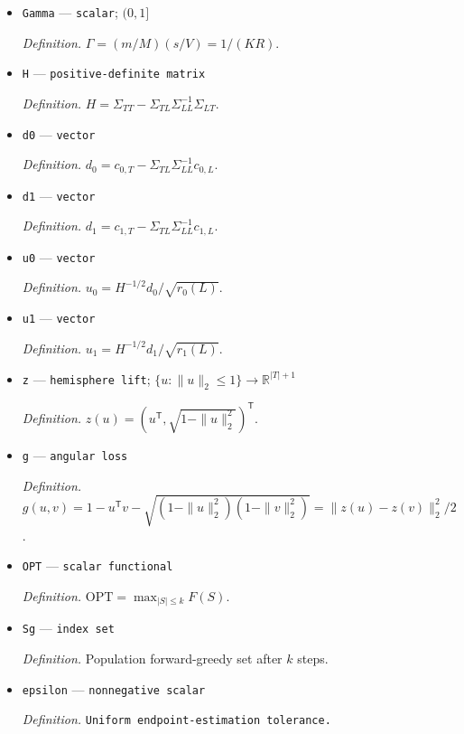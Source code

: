 \documentclass{article}
\begin{document}
\begin{itemize}
  \par\smallskip\noindent\emph{Definition.} Budget-\(k\) submodularity ratio of \(F\), with zero denominators omitted and value one if all denominators vanish.
  \item \texttt{Gamma} --- \texttt{scalar}; \((0,1]\)
  \par\smallskip\noindent\emph{Definition.} \(\Gamma=(m/M)(s/V)=1/(KR)\).
  \item \texttt{H} --- \texttt{positive-\allowbreak{}definite matrix}
  \par\smallskip\noindent\emph{Definition.} \(H=\Sigma_{TT}-\Sigma_{TL}\Sigma_{LL}^{-1}\Sigma_{LT}\).
  \item \texttt{d0} --- \texttt{vector}
  \par\smallskip\noindent\emph{Definition.} \(d_0=c_{0,T}-\Sigma_{TL}\Sigma_{LL}^{-1}c_{0,L}\).
  \item \texttt{d1} --- \texttt{vector}
  \par\smallskip\noindent\emph{Definition.} \(d_1=c_{1,T}-\Sigma_{TL}\Sigma_{LL}^{-1}c_{1,L}\).
  \item \texttt{u0} --- \texttt{vector}
  \par\smallskip\noindent\emph{Definition.} \(u_0=H^{-1/2}d_0/\sqrt{r_0(L)}\).
  \item \texttt{u1} --- \texttt{vector}
  \par\smallskip\noindent\emph{Definition.} \(u_1=H^{-1/2}d_1/\sqrt{r_1(L)}\).
  \item \texttt{z} --- \texttt{hemisphere lift}; \(\{u:\|u\|_2\le1\}\to\mathbb R^{|T|+1}\)
  \par\smallskip\noindent\emph{Definition.} \(z(u)=(u^{\mathsf T},\sqrt{1-\|u\|_2^2})^{\mathsf T}\).
  \item \texttt{g} --- \texttt{angular loss}
  \par\smallskip\noindent\emph{Definition.} \(g(u,v)=1-u^{\mathsf T}v-\sqrt{(1-\|u\|_2^2)(1-\|v\|_2^2)}=\|z(u)-z(v)\|_2^2/2\).
  \item \texttt{OPT} --- \texttt{scalar functional}
  \par\smallskip\noindent\emph{Definition.} \(\mathrm{OPT}=\max_{|S|\le k}F(S)\).
  \item \texttt{Sg} --- \texttt{index set}
  \par\smallskip\noindent\emph{Definition.} Population forward-greedy set after \(k\) steps.
  \item \texttt{epsilon} --- \texttt{nonnegative scalar}
  \par\smallskip\noindent\emph{Definition.} \texttt{Uniform endpoint-\allowbreak{}estimation tolerance.}

\end{itemize}
\end{document}
